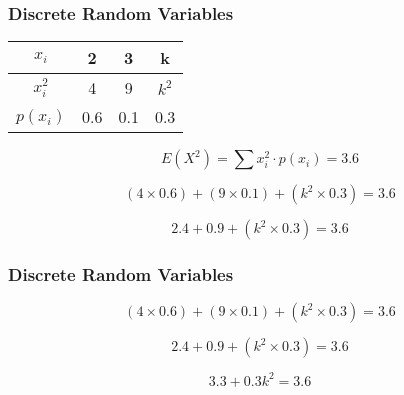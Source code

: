 \documentclass{beamer}
\begin{document}
\begin{frame}
\frametitle{Discrete Random Variables}
\Large
\vspace{-2cm}

\begin{center}
\begin{tabular}{|c|c|c|c|}
\hline
$x_i$ & \phantom{sp}2\phantom{sp} & \phantom{sp}3\phantom{sp} & \phantom{sp}k\phantom{sp} \\ \hline
$x^2_i$ & 4 & 9 & $k^2$ \\ \hline
$p(x_i)$ & 0.6 &  0.1 & 0.3 \\ \hline 
\end{tabular}
\end{center}



\[ E(X^2) =  \sum  x^2_i \cdot p(x_i)  = 3.6 \]

\[(4 \times 0.6) + (9\times 0.1) + (k^2\times 0.3) = 3.6 \]

\[2.4 + 0.9 + (k^2\times 0.3) = 3.6 \]

\end{frame}


\begin{frame}
\frametitle{Discrete Random Variables}
\Large
\vspace{-2cm}
\[(4 \times 0.6) + (9\times 0.1) + (k^2\times 0.3) = 3.6 \]

\[2.4 + 0.9 + (k^2\times 0.3) = 3.6 \]

\[ 3.3 + 0.3k^2 = 3.6\]



\end{frame}
\end{document}
